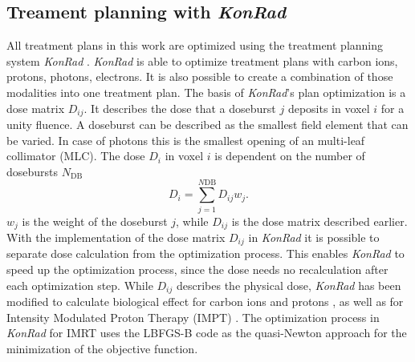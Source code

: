 \subsection{Treament planning with \textit{KonRad}}
All treatment plans in this work are optimized using the treatment planning system \textit{KonRad} \cite{nill}. \textit{KonRad} is able to optimize treatment plans with carbon ions, protons, photons, electrons. It is also possible to create a combination of those modalities into one treatment plan. The basis of \textit{KonRad}'s plan optimization is a dose matrix $D_{ij}$. It describes the dose that a doseburst $j$ deposits in voxel $i$ for a unity fluence. A doseburst can be described as the smallest field element that can be varied. In case of photons this is the smallest opening of an multi-leaf collimator (MLC). The dose $D_i$ in voxel $i$ is dependent on the number of dosebursts $N_{\mathrm{DB}}$
\begin{equation}
D_i = \sum\limits_{j=1}^{N\mathrm{DB}}D_{ij}w_j.
\end{equation}
$w_j$ is the weight of the doseburst $j$, while $D_{ij}$ is the dose matrix described earlier. With the implementation of the dose matrix $D_{ij}$ in \textit{KonRad} it is possible to separate dose calculation from the optimization process. This enables \textit{KonRad} to speed up the optimization process, since the dose needs no recalculation after each optimization step. While $D_{ij}$ describes the physical dose, \textit{KonRad} has been modified to calculate biological effect for carbon ions \cite{pmid16757867} and protons \cite{pmid15285249}, as well as for Intensity Modulated Proton Therapy (IMPT) \cite{pmid15789592}. The optimization process in \textit{KonRad} for IMRT uses the LBFGS-B code \cite{Byrd_Lu_Nocedal_Zhu_1994} as the quasi-Newton approach for the minimization of the objective function.
